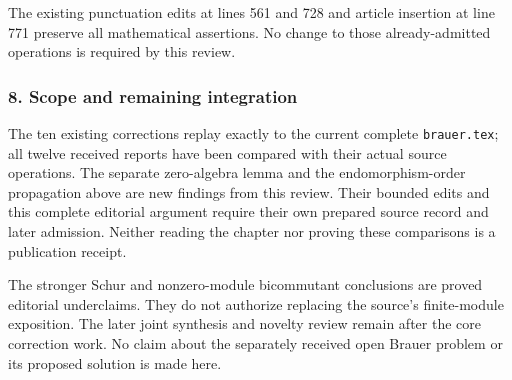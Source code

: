 The existing punctuation edits at lines 561 and 728 and article insertion at line 771 preserve all mathematical assertions. No change to those already-admitted operations is required by this review.

\subsubsection{8. Scope and remaining integration}\label{scope-and-remaining-integration}

The ten existing corrections replay exactly to the current complete \texttt{brauer.tex}; all twelve received reports have been compared with their actual source operations. The separate zero-algebra lemma and the endomorphism-order propagation above are new findings from this review. Their bounded edits and this complete editorial argument require their own prepared source record and later admission. Neither reading the chapter nor proving these comparisons is a publication receipt.

The stronger Schur and nonzero-module bicommutant conclusions are proved editorial underclaims. They do not authorize replacing the source's finite-module exposition. The later joint synthesis and novelty review remain after the core correction work. No claim about the separately received open Brauer problem or its proposed solution is made here.
